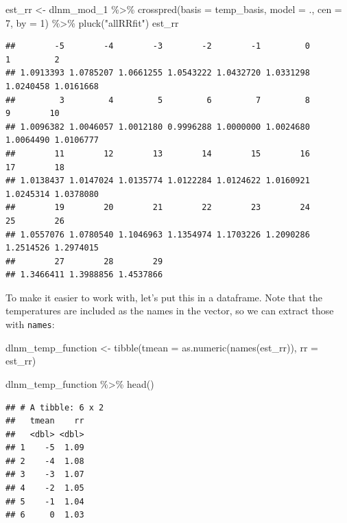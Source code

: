 \documentclass[
]{book}
\newenvironment{Shaded}{\begin{snugshade}}{\end{snugshade}}
\newcommand{\AttributeTok}[1]{\textcolor[rgb]{0.77,0.63,0.00}{#1}}
\newcommand{\DecValTok}[1]{\textcolor[rgb]{0.00,0.00,0.81}{#1}}
\newcommand{\FunctionTok}[1]{\textcolor[rgb]{0.00,0.00,0.00}{#1}}
\newcommand{\NormalTok}[1]{#1}
\newcommand{\OtherTok}[1]{\textcolor[rgb]{0.56,0.35,0.01}{#1}}
\newcommand{\SpecialCharTok}[1]{\textcolor[rgb]{0.00,0.00,0.00}{#1}}
\newcommand{\StringTok}[1]{\textcolor[rgb]{0.31,0.60,0.02}{#1}}
\begin{document}
\begin{Shaded}
\begin{Highlighting}[]
\NormalTok{est\_rr }\OtherTok{\textless{}{-}}\NormalTok{ dlnm\_mod\_1 }\SpecialCharTok{\%\textgreater{}\%} 
  \FunctionTok{crosspred}\NormalTok{(}\AttributeTok{basis =}\NormalTok{ temp\_basis, }\AttributeTok{model =}\NormalTok{ ., }\AttributeTok{cen =} \DecValTok{7}\NormalTok{, }\AttributeTok{by =} \DecValTok{1}\NormalTok{) }\SpecialCharTok{\%\textgreater{}\%} 
  \FunctionTok{pluck}\NormalTok{(}\StringTok{"allRRfit"}\NormalTok{)}
\NormalTok{est\_rr}
\end{Highlighting}
\end{Shaded}

\begin{verbatim}
##        -5        -4        -3        -2        -1         0         1         2 
## 1.0913393 1.0785207 1.0661255 1.0543222 1.0432720 1.0331298 1.0240458 1.0161668 
##         3         4         5         6         7         8         9        10 
## 1.0096382 1.0046057 1.0012180 0.9996288 1.0000000 1.0024680 1.0064490 1.0106777 
##        11        12        13        14        15        16        17        18 
## 1.0138437 1.0147024 1.0135774 1.0122284 1.0124622 1.0160921 1.0245314 1.0378080 
##        19        20        21        22        23        24        25        26 
## 1.0557076 1.0780540 1.1046963 1.1354974 1.1703226 1.2090286 1.2514526 1.2974015 
##        27        28        29 
## 1.3466411 1.3988856 1.4537866
\end{verbatim}

To make it easier to work with, let's put this in a dataframe. Note that the temperatures
are included as the names in the vector, so we can extract those with \texttt{names}:

\begin{Shaded}
\begin{Highlighting}[]
\NormalTok{dlnm\_temp\_function }\OtherTok{\textless{}{-}} \FunctionTok{tibble}\NormalTok{(}\AttributeTok{tmean =} \FunctionTok{as.numeric}\NormalTok{(}\FunctionTok{names}\NormalTok{(est\_rr)), }
                             \AttributeTok{rr =}\NormalTok{ est\_rr)}

\NormalTok{dlnm\_temp\_function }\SpecialCharTok{\%\textgreater{}\%} 
  \FunctionTok{head}\NormalTok{()}
\end{Highlighting}
\end{Shaded}

\begin{verbatim}
## # A tibble: 6 x 2
##   tmean    rr
##   <dbl> <dbl>
## 1    -5  1.09
## 2    -4  1.08
## 3    -3  1.07
## 4    -2  1.05
## 5    -1  1.04
## 6     0  1.03
\end{verbatim}
\end{document}
